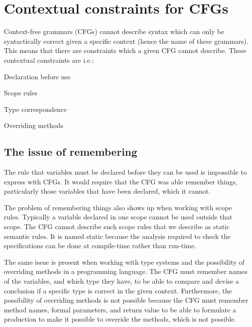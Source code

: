 \section{Contextual constraints for CFGs}
\label{sec:contextualconstraints}

Context-free grammars (CFGs) cannot describe syntax which can only be
syntactically correct given a specific context (hence the name of these
grammars). This means that there are constraints which a given CFG cannot
describe.
These contextual constraints are i.e.:
\cite[p. 39]{plpp}

\begin{dlist}
\item Declaration before use
\item Scope rules
\item Type correspondence
\item Overriding methods
\end{dlist}


\subsection{The issue of remembering}

The rule that variables must be declared before they can be used is impossible
to express with CFGs. It would require that the CFG was able remember things,
particularly those variables that have been declared, which it cannot. 

The problem of remembering things also shows up when working with scope rules.
Typically a variable declared in one scope cannot be used outside that scope.
The CFG cannot describe such scope rules that we describe as static semantic
rules. It is named static because the analysis required to check the
specifications can be done at compile-time rather than run-time.
\cite[p. 153]{sebesta2013}

The same issue is present when working with type systems and the possibility of
overriding methods in a programming language. The CFG must remember names of the
variables, and which type they have, to be able to compare and devise a conclusion
if a specific type is correct in the given context. Furthermore, the possibility
of overriding methods is not possible because the CFG must remember method
names, formal parameters, and return value to be able to formulate a production
to make it possible to override the methods, which is not possible.

